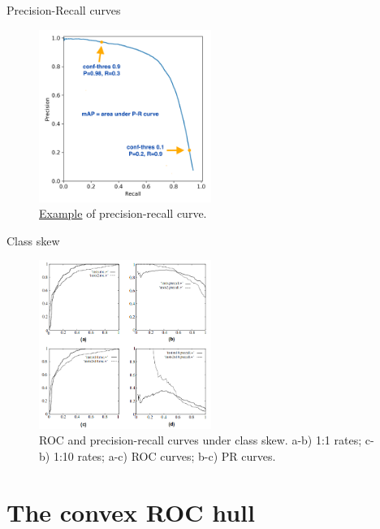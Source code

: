 \documentclass{beamer}
\begin{document}
\begin{frame}{Precision-Recall curves}
  \begin{figure}
    \includegraphics[width=0.5\textwidth]{PrecisionRecall}
    \caption{\href{https://github.com/ultralytics/yolov3/issues/898}{Example} of precision-recall curve.}
  \end{figure}
\end{frame}

\begin{frame}{Class skew}
  \begin{figure}
    \includegraphics[width=0.5\textwidth]{PrecisionRecallROC}
    \caption{ROC and precision-recall curves under class skew. a-b) 1:1 rates; c-b) 1:10 rates; a-c) ROC curves; b-c) PR curves\cite{fawcettIntroductionROCAnalysis2006}.}
  \end{figure}
\end{frame}

\section{The convex ROC hull}
\end{document}
